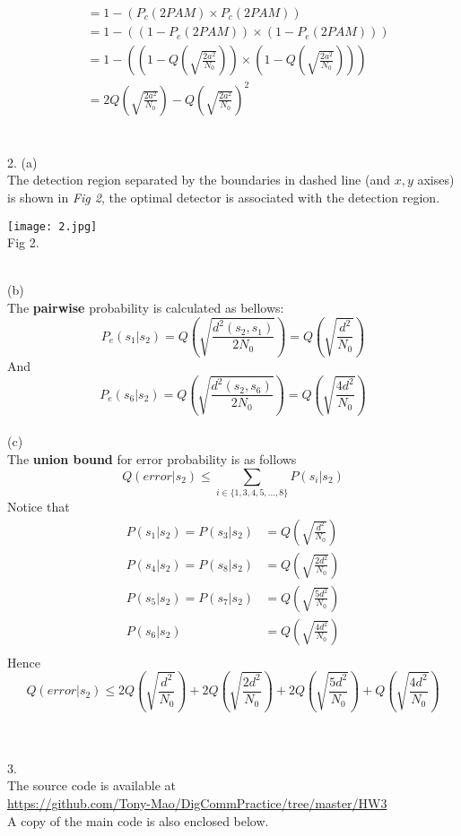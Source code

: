 \documentclass [12pt] {article}
\begin{document}
\begin{spacing}{1.5}
\begin{align*}
&= 1 -  (P_c(2PAM) \times P_c(2PAM))\\
& = 1 - ((1-P_e(2PAM) ) \times (1-P_e(2PAM) ))\\
& = 1 - ((1-Q(\sqrt{\frac{2 a^2}{N_0}})  ) \times (1-Q(\sqrt{\frac{2 a^2}{N_0}})  ))\\
& = 2Q(\sqrt{\frac{2 a^2}{N_0}}) - Q(\sqrt{\frac{2 a^2}{N_0}}) ^2
\end{align*}
~\\
~\\
2. (a)\\
The detection region separated by the boundaries in dashed line (and $x, y$ axises) is shown in \emph{Fig 2}, the optimal detector is associated with the detection region. \\
\begin{center}
\texttt{[image: 2.jpg]}\\
\small
Fig 2. \\
\end{center}
~\\
\normalsize
(b)\\
The \textbf{pairwise} probability is calculated as bellows:
$$ P_e(s_1|s_2) = Q(\sqrt{\frac{d^2(s_2,s_1)}{2N_0}}) = Q(\sqrt{\frac{d^2}{N_0}}) $$
And
$$ P_e(s_6|s_2) = Q(\sqrt{\frac{d^2(s_2,s_6)}{2N_0}}) = Q(\sqrt{\frac{4d^2}{N_0}}) $$
~\\
(c)\\
The \textbf{union bound} for error probability is as follows
$$Q(error|s_2)\leq \sum_{i\in\{1,3,4,5,...,8\}}P(s_i|s_2) $$
Notice that
\begin{align*}
P(s_1|s_2) = P(s_3|s_2) &= Q(\sqrt{\frac{d^2}{N_0}})\\
P(s_4|s_2) = P(s_8|s_2) &= Q(\sqrt{\frac{2d^2}{N_0}})\\
P(s_5|s_2) = P(s_7|s_2) &= Q(\sqrt{\frac{5d^2}{N_0}})\\
P(s_6|s_2) &= Q(\sqrt{\frac{4d^2}{N_0}})\\
\end{align*}
Hence
$$Q(error|s_2)\leq 2 Q(\sqrt{\frac{d^2}{N_0}}) + 2  Q(\sqrt{\frac{2d^2}{N_0}})+2 Q(\sqrt{\frac{5d^2}{N_0}})+  Q(\sqrt{\frac{4d^2}{N_0}})$$
\end{spacing}
~\\
~\\
3. \\
The source code is available at\\
 \url{https://github.com/Tony-Mao/DigCommPractice/tree/master/HW3}\\
 A copy of the main code is also enclosed below.\\
\end{document}
